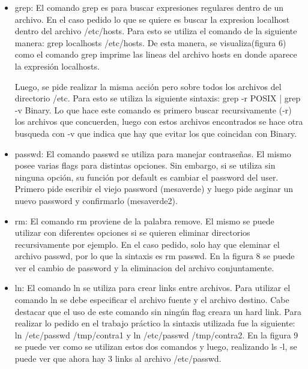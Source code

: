 \documentclass[a4paper, 12pt]{article}
\begin{document}
\begin{itemize}
Cabe destacar que el comando chmod se utiliz\'o varias veces para ir cambiando de a poco los permisos seg\'un sean para el usuario, para el grupo o para los otros. Sin embargo, esto se puede realizar utilizando una sola vez el comando chmod. La sintaxis para el mismo ser\'ia chmod 751 passwd. El numero 751 esta es una manera de codificar los permisos, el 7(111) corresponde al user y esta poniendo en 1 los 3 permisos; el 5(101) es para el grupo, dado un orden predispuesto, lo que hace esto es setear en 1 los permisos de Read y eXecute, que son el primero y el tercero respectivamente, y setea en 0 el segundo permiso(Write). Por \'ultimo, el 1(001) corresponde a setear el permiso de eXecute para los Others.

\item grep: El comando grep es para buscar expresiones regulares dentro de un archivo. En el caso pedido lo que se quiere es buscar la expresion localhost dentro del archivo /etc/hosts. Para esto se utiliza el comando de la siguiente manera: grep localhosts /etc/hosts. De esta manera, se visualiza(figura 6) como el comando grep imprime las lineas del archivo hosts en donde aparece la expresi\'on localhosts.

Luego, se pide realizar la misma acci\'on pero sobre todos los archivos del directorio /etc.
Para esto se utiliza la siguiente sintaxis: grep -r POSIX | grep -v Binary. Lo que hace este comando es primero buscar recursivamente (-r) los archivos que concuerden, luego con estos archivos encontrados se hace otra busqueda con -v que indica que hay que evitar los que coincidan con Binary.

\item passwd: El comando passwd se utiliza para manejar contrase\~{n}as. El mismo posee varias flags para distintas opciones. Sin embargo, si se utiliza sin ninguna opci\'on, su funci\'on por default es cambiar el password del user. Primero pide escribir el viejo password (mesaverde) y luego pide asginar un nuevo password y confirmarlo (mesaverde2).

\item rm: El comando rm proviene de la palabra remove. El mismo se puede utilizar con diferentes opciones si se quieren eliminar directorios recursivamente por ejemplo. En el caso pedido, solo hay que eleminar el archivo passwd, por lo que la sintaxis es rm passwd. En la figura 8 se puede ver el cambio de password y la eliminacion del archivo conjuntamente.

\item ln: El comando ln se utiliza para crear links entre archivos. Para utilizar el comando ln se debe especificar el archivo fuente y el archivo destino. Cabe destacar que el uso de este comando sin ning\'un flag creara un hard link. Para realizar lo pedido en el trabajo pr\'actico la sintaxis utilizada fue la siguiente: ln /etc/passwd /tmp/contra1 y ln /etc/passwd /tmp/contra2. En la figura 9 se puede ver como se utilizan estos dos comandos y luego, realizando ls -l, se puede ver que ahora hay 3 links al archivo /etc/passwd.


\end{itemize}
\end{document}

